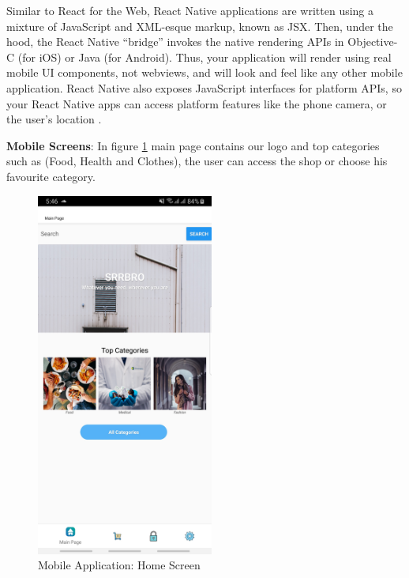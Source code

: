Similar to React for the Web, React Native applications are written using a mixture of JavaScript and XML-esque markup, known as JSX. Then, under the hood, the React Native “bridge” invokes the native rendering APIs in Objective-C (for iOS) or Java (for Android). Thus, your application will render using real mobile UI components, not webviews, and will look and feel like any other mobile application. React Native also exposes JavaScript interfaces for platform APIs, so your React Native apps can access platform features like the phone camera, or the user’s location \cite{React-native}.\newpage

\textbf{Mobile Screens}:
\newline
 In figure \ref{fig: homescreen} main page contains our logo and top categories such as (Food, Health and Clothes), the user can access the shop or choose his favourite category.

\begin{figure}[htp]%
    \center%
    \includegraphics[width=0.52\textwidth]{images/Software/Mainscreen.jpg}%
    \caption[Mobile Application: Home Screen]{Mobile Application: Home Screen}\label{fig: homescreen}%
  \end{figure}
  
